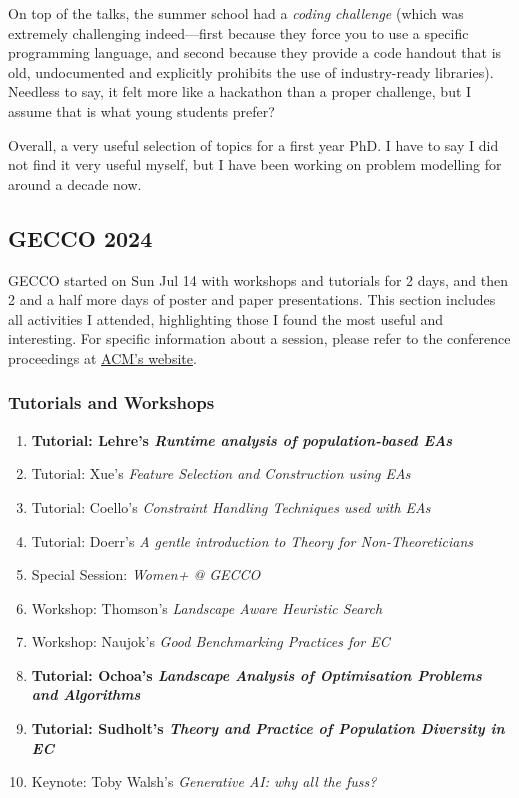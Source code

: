 \documentclass[11pt, letterpaper, oneside]{article}
\begin{document}
On top of the talks, the summer school had a \textit{coding challenge} (which was extremely challenging indeed---first because they force you to use a specific programming language, and second because they provide a code handout that is old, undocumented and explicitly prohibits the use of industry-ready libraries).
Needless to say, it felt more like a hackathon than a proper challenge, but I assume that is what young students prefer?

Overall, a very useful selection of topics for a first year PhD. I have to say I did not find it very useful myself, but I have been working on problem modelling for around a decade now.

\subsection{GECCO 2024}


GECCO started on Sun Jul 14 with workshops and tutorials for 2 days, and then 2 and a half more days of poster and paper presentations.
This section includes all activities I attended, highlighting those I found the most useful and interesting.
For specific information about a session, please refer to the conference proceedings at \href{https://dl.acm.org/conference/gecco/proceedings}{ACM's website}.

\subsubsection{Tutorials and Workshops}

\begin{enumerate}
    \item \textbf{Tutorial: Lehre's \textit{Runtime analysis of population-based EAs}}
    \item Tutorial: Xue's \textit{Feature Selection and Construction using EAs}
    \item Tutorial: Coello's \textit{Constraint Handling Techniques used with EAs}
    \item Tutorial: Doerr's \textit{A gentle introduction to Theory for Non-Theoreticians}
    \item Special Session: \textit{Women+ @ GECCO}
    \item Workshop: Thomson's \textit{Landscape Aware Heuristic Search}
    \item Workshop: Naujok's \textit{Good Benchmarking Practices for EC}
    \item \textbf{Tutorial: Ochoa's \textit{Landscape Analysis of Optimisation Problems and Algorithms}}
    \item \textbf{Tutorial: Sudholt's \textit{Theory and Practice of Population Diversity in EC}}
    \item Keynote: Toby Walsh's \textit{Generative AI: why all the fuss?}
\end{enumerate}
\end{document}
